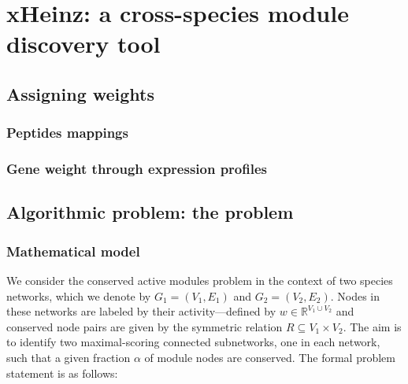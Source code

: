 \chapter{xHeinz: a cross-species module discovery tool}
\label{chap:xheinz}

\section{Assigning weights}
\label{sec:weights}

	\subsection{Peptides mappings}

	\subsection{Gene weight through expression profiles}

\section{Algorithmic problem: the \mwccs{} problem}
\label{sec:mip}

	\subsection{Mathematical model}

		We consider the conserved active modules problem in the context of two species networks, which we denote by $G_1 = (V_1, E_1)$ and $G_2 = (V_2, E_2)$.
		Nodes in these networks are labeled by their activity---defined by $w \in \mathbb{R}^{V_1 \cup V_2}$ and conserved node pairs are given by the symmetric relation $R \subseteq V_1 \times V_2$. The aim is to identify two maximal-scoring connected subnetworks, one in each network, such that a given fraction $\alpha$ of module nodes are conserved.
		The formal problem statement is as follows:

